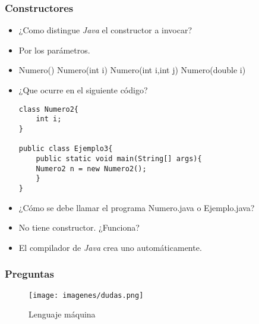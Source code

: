 \documentclass{beamer}
\begin{document}
\begin{frame}[fragile]
\frametitle{Constructores}
\begin{itemize}[<+->]
\item ¿Como distingue \emph{Java} el constructor a invocar?
\item Por los parámetros.
\item Numero() Numero(int i) Numero(int i,int j) Numero(double i)
\item ¿Que ocurre en el siguiente código?
\begin{verbatim}
class Numero2{
    int i;
}

public class Ejemplo3{
    public static void main(String[] args){
    Numero2 n = new Numero2();
    }
}
\end{verbatim}
\item ¿Cómo se debe llamar el programa Numero.java o Ejemplo.java?
\item No tiene constructor. ¿Funciona?
\item El compilador de \emph{Java} crea uno automáticamente.
\end{itemize}
\end{frame}
\begin{frame}
\frametitle{Preguntas} 
\begin{figure}
\texttt{[image: imagenes/dudas.png]} 
\caption{Lenguaje máquina}
\end{figure} 
\end{frame}
\end{document}
